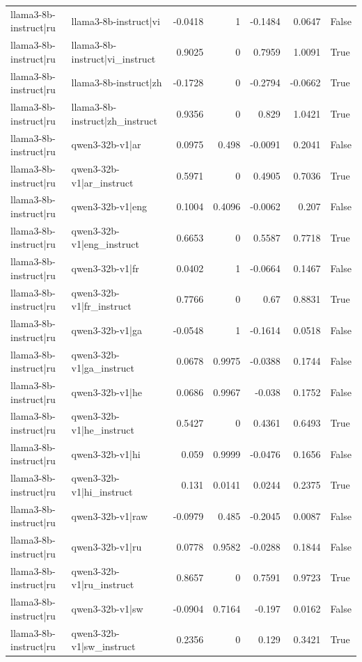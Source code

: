 \begin{table}
\begin{tabular}{l l r r r r l}
llama3-8b-instruct|ru & llama3-8b-instruct|vi & -0.0418 & 1 & -0.1484 & 0.0647 & False \\
llama3-8b-instruct|ru & llama3-8b-instruct|vi_instruct & 0.9025 & 0 & 0.7959 & 1.0091 & True \\
llama3-8b-instruct|ru & llama3-8b-instruct|zh & -0.1728 & 0 & -0.2794 & -0.0662 & True \\
llama3-8b-instruct|ru & llama3-8b-instruct|zh_instruct & 0.9356 & 0 & 0.829 & 1.0421 & True \\
llama3-8b-instruct|ru & qwen3-32b-v1|ar & 0.0975 & 0.498 & -0.0091 & 0.2041 & False \\
llama3-8b-instruct|ru & qwen3-32b-v1|ar_instruct & 0.5971 & 0 & 0.4905 & 0.7036 & True \\
llama3-8b-instruct|ru & qwen3-32b-v1|eng & 0.1004 & 0.4096 & -0.0062 & 0.207 & False \\
llama3-8b-instruct|ru & qwen3-32b-v1|eng_instruct & 0.6653 & 0 & 0.5587 & 0.7718 & True \\
llama3-8b-instruct|ru & qwen3-32b-v1|fr & 0.0402 & 1 & -0.0664 & 0.1467 & False \\
llama3-8b-instruct|ru & qwen3-32b-v1|fr_instruct & 0.7766 & 0 & 0.67 & 0.8831 & True \\
llama3-8b-instruct|ru & qwen3-32b-v1|ga & -0.0548 & 1 & -0.1614 & 0.0518 & False \\
llama3-8b-instruct|ru & qwen3-32b-v1|ga_instruct & 0.0678 & 0.9975 & -0.0388 & 0.1744 & False \\
llama3-8b-instruct|ru & qwen3-32b-v1|he & 0.0686 & 0.9967 & -0.038 & 0.1752 & False \\
llama3-8b-instruct|ru & qwen3-32b-v1|he_instruct & 0.5427 & 0 & 0.4361 & 0.6493 & True \\
llama3-8b-instruct|ru & qwen3-32b-v1|hi & 0.059 & 0.9999 & -0.0476 & 0.1656 & False \\
llama3-8b-instruct|ru & qwen3-32b-v1|hi_instruct & 0.131 & 0.0141 & 0.0244 & 0.2375 & True \\
llama3-8b-instruct|ru & qwen3-32b-v1|raw & -0.0979 & 0.485 & -0.2045 & 0.0087 & False \\
llama3-8b-instruct|ru & qwen3-32b-v1|ru & 0.0778 & 0.9582 & -0.0288 & 0.1844 & False \\
llama3-8b-instruct|ru & qwen3-32b-v1|ru_instruct & 0.8657 & 0 & 0.7591 & 0.9723 & True \\
llama3-8b-instruct|ru & qwen3-32b-v1|sw & -0.0904 & 0.7164 & -0.197 & 0.0162 & False \\
llama3-8b-instruct|ru & qwen3-32b-v1|sw_instruct & 0.2356 & 0 & 0.129 & 0.3421 & True \\

\end{tabular}
\end{table}
